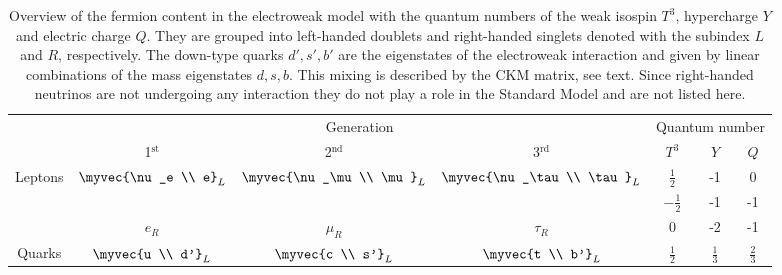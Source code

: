   \begin{table}
    \caption[Overview of the fermion content in the electroweak model.]{Overview of the fermion content in the electroweak model with the quantum numbers of the weak isospin $T^3$, hypercharge $Y$ and electric charge $Q$. They are grouped into left-handed doublets and right-handed singlets denoted with the subindex $L$ and $R$, respectively. The down-type quarks $d', s', b'$ are the eigenstates of the electroweak interaction and given by linear combinations of the mass eigenstates $d, s, b$. This mixing is described by the CKM matrix, see text. Since right-handed neutrinos are not undergoing any interaction they do not play a role in the Standard Model and are not listed here.}
    \label{tab:ewfermioncontent}
    \centering
      \begin{tabular}{c |@{}| c c c | c c c}
        \toprule
                                 & \multicolumn{3}{c}{Generation}          & \multicolumn{3}{|c}{Quantum number}                                                                                                            \\
                                 & 1$^{\text{st}}$                         & 2$^{\text{nd}}$                             & 3$^{\text{rd}}$                               & $T^3$          & $Y$            & $Q$            \\
        \midrule
        \multirow{3}{*}{Leptons} & \multirow{2}{*}{$\myvec{\nu_e                                                                                                                                                            \\ e}_L$} & \multirow{2}{*}{$\myvec{\nu_\mu \\ \mu}_L$} & \multirow{2}{*}{$\myvec{\nu_\tau \\ \tau}_L$} & $\frac{1}{2}$  & -1             & 0 \\
                                 &                                         &                                             &                                               & $-\frac{1}{2}$ & -1             & -1             \\
                                 & $e_R$                                   & $\mu_R$                                     & $\tau_R$                                      & 0              & -2             & -1             \\
        \midrule
        \multirow{3}{*}{Quarks}  & \multirow{2}{*}{$\myvec{u                                                                                                                                                                \\ d'}_L$}    & \multirow{2}{*}{$\myvec{c \\ s'}_L$}        & \multirow{2}{*}{$\myvec{t \\ b'}_L$}          & $\frac{1}{2}$  & $\frac{1}{3}$  & $\frac{2}{3}$ \\

\end{tabular}
\end{table}
